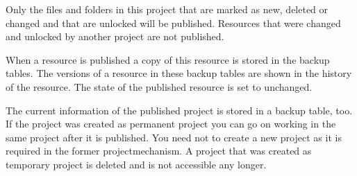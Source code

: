 Only the files and folders in this project that are marked as new,
deleted or changed and that are unlocked will be published.
Resources that were changed and unlocked by another project are
not published.

When a resource is published a copy of this resource is stored in
the backup tables. The versions of a resource in these backup
tables are shown in the  history of the resource.
The state of the published resource is set to unchanged.

The current information of the published project is stored in a
backup table, too. If the project was created as permanent project
you can go on working in the same project after it is published.
You need not to create a new project as it is required in the
former projectmechanism. A project that was created as temporary
project is deleted and is not accessible any longer.
